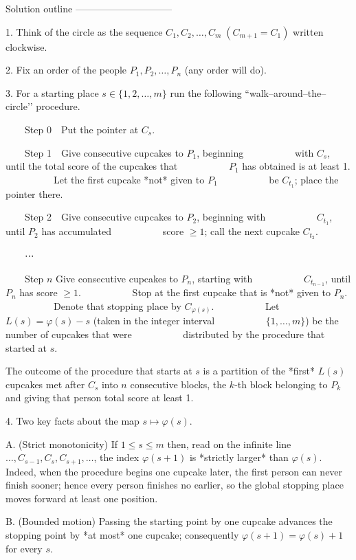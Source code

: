 Solution outline  
——————————

1.  Think of the circle as the sequence  
   $C_{1},C_{2},\dots ,C_{m}\;(C_{m+1}=C_{1})$ written clockwise.

2.  Fix an order of the people  
   $P_{1},P_{2},\dots ,P_{n}$ (any order will do).

3.  For a starting place $s\in\{1,2,\dots ,m\}$ run the
   following “walk–around–the–circle’’ procedure.

  Step 0 Put the pointer at $C_{s}$.

  Step 1 Give consecutive cupcakes to $P_{1}$, beginning
     with $C_{s}$, until the total score of the cupcakes that
     $P_{1}$ has obtained is at least 1.  
     Let the first cupcake *not* given to $P_{1}$
     be $C_{t_{1}}$; place the pointer there.

  Step 2 Give consecutive cupcakes to $P_{2}$, beginning with
     $C_{t_{1}}$, until $P_{2}$ has accumulated
     score $\ge 1$; call the next cupcake $C_{t_{2}}$.

  \qquad  ⋯  

  Step $n$  Give consecutive cupcakes to $P_{n}$, starting with
     $C_{t_{n-1}}$, until $P_{n}$ has score $\ge1$.
     Stop at the first cupcake that is *not* given to $P_{n}$.
     Denote that stopping place by $C_{\varphi(s)}$.
     Let $L(s)=\varphi(s)-s$ (taken in the integer interval
     $\{1,\dots ,m\}$) be the number of cupcakes that were
     distributed by the procedure that started at $s$.

   The outcome of the procedure that starts at $s$
   is a partition of the *first* $L(s)$ cupcakes met
   after $C_{s}$ into $n$ consecutive
   blocks, the $k$-th block belonging to $P_{k}$ and giving that
   person total score at least 1.

4.  Two key facts about the map $s\mapsto\varphi(s)$.

   A. (Strict monotonicity)  
      If $1\le s\le m$ then, read on the
      infinite line $\dots ,C_{s-1},C_{s},C_{s+1},\dots$,
      the index $\varphi(s+1)$ is *strictly larger* than
      $\varphi(s)$.  
      Indeed, when the procedure begins one cupcake later, the
      first person can never finish sooner; hence every person
      finishes no earlier, so the global stopping place moves
      forward at least one position.

   B. (Bounded motion)  
      Passing the starting point by one cupcake advances
      the stopping point by *at most* one cupcake; consequently
      $\varphi(s+1)=\varphi(s)+1$ for every $s$.

